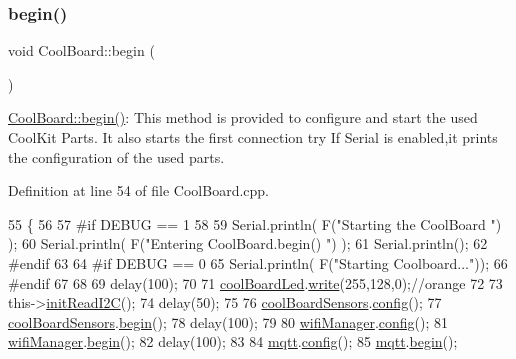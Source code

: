 \subsubsection{\texorpdfstring{begin()}{begin()}}
{\footnotesize\ttfamily void Cool\+Board\+::begin (\begin{DoxyParamCaption}{ }\end{DoxyParamCaption})}

\hyperlink{class_cool_board_acba7c5aef7268b2c0044bdb54d3b9d76}{Cool\+Board\+::begin()}\+: This method is provided to configure and start the used Cool\+Kit Parts. It also starts the first connection try If Serial is enabled,it prints the configuration of the used parts. 

Definition at line 54 of file Cool\+Board.\+cpp.


\begin{DoxyCode}
55 \{
56 
57 \textcolor{preprocessor}{#if DEBUG == 1}
58 
59     Serial.println( F(\textcolor{stringliteral}{"Starting the CoolBoard  "})  );
60     Serial.println( F(\textcolor{stringliteral}{"Entering CoolBoard.begin() "})  );
61     Serial.println();
62 \textcolor{preprocessor}{#endif  }
63 
64 \textcolor{preprocessor}{#if DEBUG == 0}
65     Serial.println( F(\textcolor{stringliteral}{"Starting Coolboard..."}));
66 \textcolor{preprocessor}{#endif}
67 
68 
69     delay(100);
70     
71     \hyperlink{class_cool_board_a1b1d3c684a5baa56b08486e192fd8e97}{coolBoardLed}.\hyperlink{class_cool_board_led_a30fadd4cbec17ceea428bf7a32207e87}{write}(255,128,0);\textcolor{comment}{//orange}
72 
73     this->\hyperlink{class_cool_board_a397b46fadab8f530a8cf4d914c561366}{initReadI2C}();
74     delay(50);
75 
76     \hyperlink{class_cool_board_af102be5288bd7f7a8e59b13f86e26a00}{coolBoardSensors}.\hyperlink{class_cool_board_sensors_a9a218895c5423375c33c08f2c56fb23a}{config}();
77     \hyperlink{class_cool_board_af102be5288bd7f7a8e59b13f86e26a00}{coolBoardSensors}.\hyperlink{class_cool_board_sensors_a97095823ef7c8f5290812f1405b966b3}{begin}();
78     delay(100);
79     
80     \hyperlink{class_cool_board_acd88e6003606b47479ebba81e4aceeca}{wifiManager}.\hyperlink{class_cool_wifi_a4eb2f6b9b09dd588964b88b6c70122c0}{config}();
81     \hyperlink{class_cool_board_acd88e6003606b47479ebba81e4aceeca}{wifiManager}.\hyperlink{class_cool_wifi_a46942fed90e475112cc10b78a32e7aaa}{begin}();
82     delay(100);
83 
84     \hyperlink{class_cool_board_a2399f44d7c23c1149a335cb3b46d90f1}{mqtt}.\hyperlink{class_cool_m_q_t_t_a9b703de4f1358f0ee7a5e8c44979c648}{config}();
85     \hyperlink{class_cool_board_a2399f44d7c23c1149a335cb3b46d90f1}{mqtt}.\hyperlink{class_cool_m_q_t_t_ac9248808641ebf3054ed0620ea9d0100}{begin}();

\end{DoxyCode}
